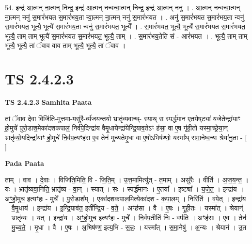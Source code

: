 \documentclass[17pt]{extarticle}
\begin{document}
54. इन्द्र॑ आ॒त्मन् ना॒त्मन् निन्द्र॒ इन्द्र॑ आ॒त्मन् नन्वन्वा॒त्मन् निन्द्र॒ इन्द्र॑ आ॒त्मन् ननु॑ । . आ॒त्मन् नन्वन्वा॒त्मन् ना॒त्मन् ननु॑ स॒मारं॑भयत स॒मारं॑भय॒ता न्वा॒त्मन् ना॒त्मन् ननु॑ स॒मारं॑भयत । . अनु॑ स॒मारं॑भयत स॒मारं॑भय॒ता न्वनु॑ स॒मारं॑भयत॒ भूत्यै॒ भूत्यै॑ स॒मारं॑भय॒ता न्वनु॑ स॒मारं॑भयत॒ भूत्यै᳚ । . स॒मारं॑भयत॒ भूत्यै॒ भूत्यै॑ स॒मारं॑भयत स॒मारं॑भयत॒ भूत्यै॒ ताम् ताम् भूत्यै॑ स॒मारं॑भयत स॒मारं॑भयत॒ भूत्यै॒ ताम् । . स॒मारं॑भय॒तेति॑ सं - आरं॑भयत । . भूत्यै॒ ताम् ताम् भूत्यै॒ भूत्यै॒ तां ॅवाव वाव ताम् भूत्यै॒ भूत्यै॒ तां ॅवाव । \newline
\pagebreak
{}

\section{ TS 2.4.2.3 }

\textbf{TS 2.4.2.3 } \newline
\textbf{Samhita Paata} \newline

तां ॅवाव दे॒वा विजि॑ति-मुत्त॒मा-मसु॑रै॒-र्व्य॑जयन्त॒यो भ्रातृ॑व्यवा॒न्थ्- स्याथ् स स्पर्द्ध॑मान ए॒तयेष्‌ट्या॑ यजे॒तेन्द्रा॑याꣳ हो॒मुचे॑ पुरो॒डाश॒मेका॑दशकपालं॒ निर्व॑पे॒दिन्द्रा॑य वैमृ॒धायेन्द्रा॑येन्द्रि॒याव॒तेऽꣳ ह॑सा॒ वा ए॒ष गृ॑ही॒तो यस्मा॒च्छ्रेया॒न् भ्रातृ॑व्यो॒यदिन्द्रा॑याꣳ हो॒मुचे॑ नि॒र्वप॒त्यꣳह॑स ए॒व तेन॑ मुच्यतेमृ॒धा वा ए॒षो॑ऽभिष॑ण्णो॒ यस्मा᳚थ् समा॒नेष्व॒न्यः श्रेया॑नु॒ता - [  ] \newline

\textbf{Pada Paata} \newline

ताम् । वाव । दे॒वाः । विजि॑ति॒मिति॒ वि - जि॒ति॒म् । उ॒त्त॒मामित्यु॑त् - त॒माम् । असु॑रैः । वीति॑ । अ॒ज॒य॒न्त॒ । यः । भ्रातृ॑व्यवा॒निति॒ भ्रातृ॑व्य - वा॒न् । स्यात् । सः । स्पर्द्ध॑मानः । ए॒तया᳚ । इष्ट्या᳚ । य॒जे॒त॒ । इन्द्रा॑य । अꣳ॒॒हो॒मुच॒ इत्यꣳ॑हः - मुचे᳚ । पु॒रो॒डाश᳚म् । एका॑दशकपाल॒मित्येका॑दश - क॒पा॒ल॒म् । निरिति॑ । व॒पे॒त् । इन्द्रा॑य । वै॒मृ॒धाय॑ । इन्द्रा॑य । इ॒न्द्रि॒याव॑त॒ इती᳚न्द्रि॒य - व॒ते॒ । अꣳह॑सा । वै । ए॒षः । गृ॒ही॒तः । यस्मा᳚त् । श्रेयान्॑ । भ्रातृ॑व्यः । यत् । इन्द्रा॑य । अꣳ॒॒हो॒मुच॒ इत्यꣳ॑हः - मुचे᳚ । नि॒र्वप॒तीति॑ निः - वप॑ति । अꣳह॑सः । ए॒व । तेन॑ । मु॒च्य॒ते॒ । मृ॒धा । वै । ए॒षः । अ॒भिष॑ण्ण॒ इत्य॒भि - स॒न्नः॒ । यस्मा᳚त् । स॒मा॒नेषु॑ । अ॒न्यः । श्रेयान॑ । उ॒त ।  \newline
\end{document}
